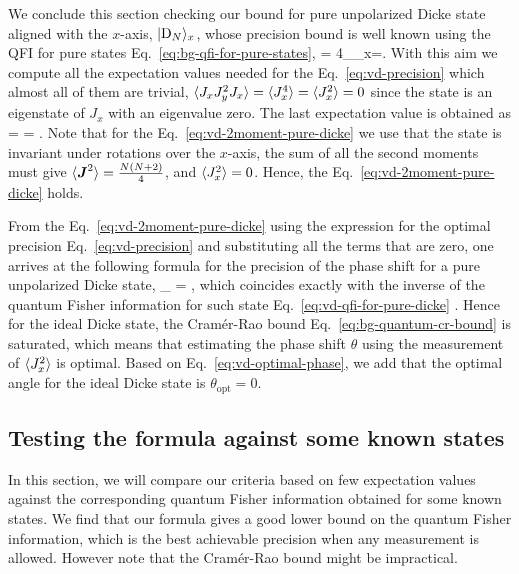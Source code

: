 We conclude this section checking our bound for pure unpolarized Dicke state aligned with the $x$-axis, $\vert{\ensuremath{\textnormal{D}_{N}}}\rangle_x$, whose precision bound is well known using the QFI for pure states Eq.~\eqref{eq:bg-qfi-for-pure-states},
\be
   = 4_{_x}=.
  \label{eq:vd-qfi-for-pure-dicke}
\ee
With this aim we compute all the expectation values needed for the Eq.~\eqref{eq:vd-precision} which almost all of them are trivial, $\langle{J_xJ_y^2J_x}\rangle=\langle{J_x^4}\rangle=\langle{J_x^2}\rangle=0$ since the state is an eigenstate of $J_x$ with an eigenvalue zero.
The last expectation value is obtained as
\be
   =  = .
  \label{eq:vd-2moment-pure-dicke}
\ee
Note that for the Eq.~\eqref{eq:vd-2moment-pure-dicke} we use that the state is invariant under rotations over the $x$-axis, the sum of all the second moments must give $\langle{\ensuremath{\boldsymbol{J}}^2}\rangle = \frac{N (N+2)}{4}$, and $\langle{J_x^2}\rangle=0$.
Hence, the Eq.~\eqref{eq:vd-2moment-pure-dicke} holds.

From the Eq.~\eqref{eq:vd-2moment-pure-dicke} using the expression for the optimal precision Eq.~\eqref{eq:vd-precision} and substituting all the terms that are zero, one arrives at the following formula for the precision of the phase shift for a pure unpolarized Dicke state,
\be
  \varian{\theta}_{} = ,
\ee
which coincides exactly with the inverse of the quantum Fisher information for such state Eq.~\eqref{eq:vd-qfi-for-pure-dicke} \cite{Luecke2011}.
Hence for the ideal Dicke state, the Cramér-Rao bound Eq.~\eqref{eq:bg-quantum-cr-bound} is saturated, which means that estimating the phase shift $\theta$ using the measurement of $\langle{J_x^2}\rangle$ is optimal.
Based on Eq.~\eqref{eq:vd-optimal-phase}, we add that the optimal angle for the ideal Dicke state is $\theta_{\text{opt}}=0$.

\subsection{Testing the formula against some known states}
\label{sec:vd-comparison-with-qfi}

In this section, we will compare our criteria based on few expectation values against the corresponding quantum Fisher information obtained for some known states.
We find that our formula gives a good lower bound on the quantum Fisher information, which is the best achievable precision when any measurement is allowed.
However note that the Cramér-Rao bound might be impractical.


